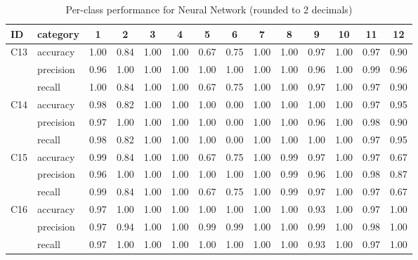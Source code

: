 \documentclass[11pt]{article}
\begin{document}
\begin{table}  [h]
  \centering
  \begin{tabular}{llcccccccccccc}
      \toprule
      ID & category & 1 & 2 & 3 & 4 & 5 & 6 & 7 & 8 & 9 & 10 & 11 & 12 \\
      \midrule

      \multirow{3}{*}{C13}
        & accuracy  & 1.00 & 0.84 & 1.00 & 1.00 & 0.67 & 0.75 & 1.00 & 1.00 & 0.97 & 1.00 & 0.97 & 0.90 \\
        & precision & 0.96 & 1.00 & 1.00 & 1.00 & 1.00 & 1.00 & 1.00 & 1.00 & 0.96 & 1.00 & 0.99 & 0.96 \\
        & recall    & 1.00 & 0.84 & 1.00 & 1.00 & 0.67 & 0.75 & 1.00 & 1.00 & 0.97 & 1.00 & 0.97 & 0.90 \\
      \midrule

      \multirow{3}{*}{C14}
        & accuracy  & 0.98 & 0.82 & 1.00 & 1.00 & 1.00 & 0.00 & 1.00 & 1.00 & 1.00 & 1.00 & 0.97 & 0.95 \\
        & precision & 0.97 & 1.00 & 1.00 & 1.00 & 1.00 & 0.00 & 1.00 & 1.00 & 0.96 & 1.00 & 0.98 & 0.90 \\
        & recall    & 0.98 & 0.82 & 1.00 & 1.00 & 1.00 & 0.00 & 1.00 & 1.00 & 1.00 & 1.00 & 0.97 & 0.95 \\
      \midrule

      \multirow{3}{*}{C15}
        & accuracy  & 0.99 & 0.84 & 1.00 & 1.00 & 0.67 & 0.75 & 1.00 & 0.99 & 0.97 & 1.00 & 0.97 & 0.67 \\
        & precision & 0.96 & 1.00 & 1.00 & 1.00 & 1.00 & 1.00 & 1.00 & 0.99 & 0.96 & 1.00 & 0.98 & 0.87 \\
        & recall    & 0.99 & 0.84 & 1.00 & 1.00 & 0.67 & 0.75 & 1.00 & 0.99 & 0.97 & 1.00 & 0.97 & 0.67 \\
      \midrule

      \multirow{3}{*}{C16}
        & accuracy  & 0.97 & 1.00 & 1.00 & 1.00 & 1.00 & 1.00 & 1.00 & 1.00 & 0.93 & 1.00 & 0.97 & 1.00 \\
        & precision & 0.97 & 0.94 & 1.00 & 1.00 & 0.99 & 0.99 & 1.00 & 1.00 & 0.99 & 1.00 & 0.98 & 1.00 \\
        & recall    & 0.97 & 1.00 & 1.00 & 1.00 & 1.00 & 1.00 & 1.00 & 1.00 & 0.93 & 1.00 & 0.97 & 1.00 \\
    \bottomrule
  \end{tabular}
  \caption{Per-class performance for Neural Network (rounded to 2 decimals)}
  \label{tab:table5}
\end{table}
\end{document}
